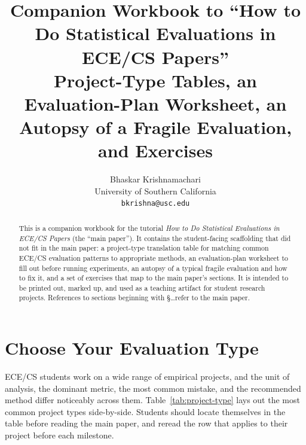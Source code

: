 \documentclass[11pt]{article}
\title{\textbf{Companion Workbook to ``How to Do Statistical Evaluations in
ECE/CS Papers''}\\
\large Project-Type Tables, an Evaluation-Plan Worksheet, an Autopsy of a
Fragile Evaluation, and Exercises}
\author{Bhaskar Krishnamachari\\
University of Southern California\\
\texttt{bkrishna@usc.edu}}
\date{}
\begin{document}
\maketitle

\begin{abstract}
This is a companion workbook for the tutorial \emph{How to Do Statistical
Evaluations in ECE/CS Papers} (the ``main paper''). It contains the
student-facing scaffolding that did not fit in the main paper: a project-type
translation table for matching common ECE/CS evaluation patterns to
appropriate methods, an evaluation-plan worksheet to fill out before running
experiments, an autopsy of a typical fragile evaluation and how to fix it,
and a set of exercises that map to the main paper's sections. It is intended
to be printed out, marked up, and used as a teaching artifact for student
research projects. References to sections beginning with \S\ldots refer to
the main paper.
\end{abstract}

\section{Choose Your Evaluation Type}
\label{sec:project-type}

ECE/CS students work on a wide range of empirical projects, and the unit of
analysis, the dominant metric, the most common mistake, and the recommended
method differ noticeably across them. Table~\ref{tab:project-type} lays out
the most common project types side-by-side. Students should locate
themselves in the table before reading the main paper, and reread the row
that applies to their project before each milestone.
\end{document}
